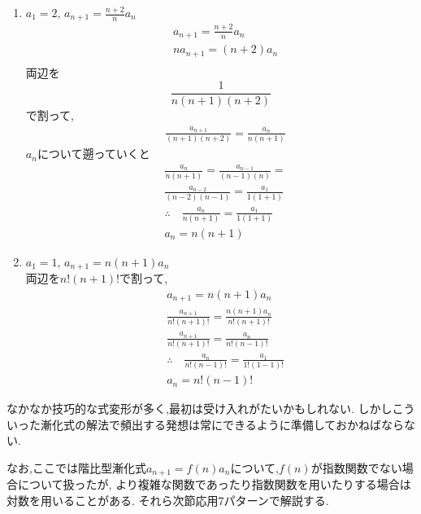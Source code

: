 \begin{enumerate}[label=(\arabic*),parsep=3pt,format=\bookitemlink{example-ratio-1}{solution}{problem}]
      \item $\displaystyle a_1=2,\, a_{n+1}=\frac{n+2}{n}a_n$
            \begin{align*}
              &a_{n+1}=\frac{n+2}{n}a_n\\
              &na_{n+1}=(n+2)a_n\\
            \end{align*}
            両辺を
            \[
              \displaystyle \frac{1}{n(n+1)(n+2)}
            \]
            で割って,
            \begin{align*}        
              &\frac{a_{n+1}}{(n+1)(n+2)}=\frac{a_{n}}{n(n+1)}
            \end{align*}
            $a_n$について遡っていくと
            \begin{align*}
              &\frac{a_{n}}{n(n+1)}=\frac{a_{n-1}}{(n-1)(n)}=\\
              &\frac{a_{n-2}}{(n-2)(n-1)}=\frac{a_{1}}{1(1+1)}\\
              &\therefore \quad \frac{a_{n}}{n(n+1)}=\frac{a_{1}}{1(1+1)}\\
              &a_n=n(n+1)
            \end{align*}
      \item $\displaystyle a_1=1,\, a_{n+1}=n(n+1)a_n$\\
              両辺を$n!(n+1)!$で割って,
            \begin{align*}
              &a_{n+1}=n(n+1)a_n\\
              &\frac{a_{n+1}}{n!(n+1)!}=\frac{n(n+1)a_n}{n!(n+1)!}\\
              &\frac{a_{n+1}}{n!(n+1)!}=\frac{a_n}{n!(n-1)!}\\
              &\therefore \quad \frac{a_n}{n!(n-1)!}=\frac{a_1}{1!(1-1)!}\\
              &a_n=n!(n-1)!
            \end{align*}
    \end{enumerate}

    なかなか技巧的な式変形が多く,最初は受け入れがたいかもしれない.
    しかしこういった漸化式の解法で頻出する発想は常にできるように準備しておかねばならない.

    なお,ここでは階比型漸化式$a_{n+1}=f(n)a_n$について,$f(n)$が指数関数でない場合について扱ったが,
    より複雑な関数であったり指数関数を用いたりする場合は対数を用いることがある.
    それら次節応用7パターンで解説する.
    

